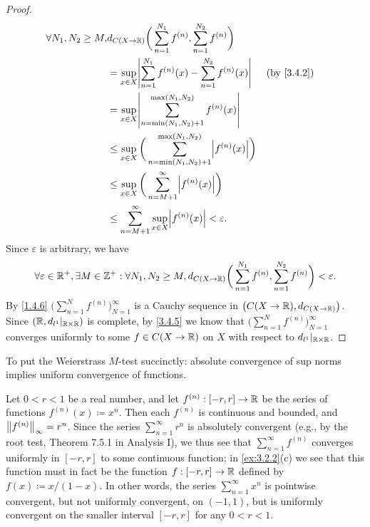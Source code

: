 \begin{proof}
  \begin{align*}
    \forall N_1, N_2 \geq M, & d_{C(X \to \R)}\bigg(\sum_{n = 1}^{N_1} f^{(n)}, \sum_{n = 1}^{N_2} f^{(n)}\bigg)                               \\
                             & = \sup_{x \in X} \abs{\sum_{n = 1}^{N_1} f^{(n)}(x) - \sum_{n = 1}^{N_2} f^{(n)}(x)}            &  & \by{3.4.2} \\
                             & = \sup_{x \in X} \abs{\sum_{n = \min(N_1, N_2) + 1}^{\max(N_1, N_2)} f^{(n)}(x)}                                \\
                             & \leq \sup_{x \in X} \bigg(\sum_{n = \min(N_1, N_2) + 1}^{\max(N_1, N_2)} \abs{f^{(n)}(x)}\bigg)                 \\
                             & \leq \sup_{x \in X} \bigg(\sum_{n = M + 1}^\infty \abs{f^{(n)}(x)}\bigg)                                        \\
                             & \leq \sum_{n = M + 1}^\infty \sup_{x \in X} \abs{f^{(n)}(x)} < \varepsilon.
  \end{align*}
  Since \(\varepsilon\) is arbitrary, we have
  \[
    \forall \varepsilon \in \R^+, \exists M \in \Z^+ : \forall N_1, N_2 \geq M, d_{C(X \to \R)}\bigg(\sum_{n = 1}^{N_1} f^{(n)}, \sum_{n = 1}^{N_2} f^{(n)}\bigg) < \varepsilon.
  \]
  By \cref{1.4.6} \(\bigg(\sum_{n = 1}^N f^{(n)}\bigg)_{N = 1}^\infty\) is a Cauchy sequence in \(\big(C(X \to \R), d_{C(X \to \R)}\big)\).
  Since \((\R, d_{l^1}|_{\R \times \R})\) is complete, by \cref{3.4.5} we know that \(\bigg(\sum_{n = 1}^N f^{(n)}\bigg)_{N = 1}^\infty\) converges uniformly to some \(f \in C(X \to \R)\) on \(X\) with respect to \(d_{l^1}|_{\R \times \R}\).
\end{proof}

\begin{note}
  To put the Weierstrass \(M\)-test succinctly:
  absolute convergence of sup norms implies uniform convergence of functions.
\end{note}

\begin{eg}\label{3.5.8}
  Let \(0 < r < 1\) be a real number, and let \(f^{(n)} : [-r, r] \to \R\) be the series of functions \(f^{(n)}(x) \coloneqq x^n\).
  Then each \(f^{(n)}\) is continuous and bounded, and \(\norm*{f^{(n)}}_\infty = r^n\).
  Since the series \(\sum_{n = 1}^\infty r^n\) is absolutely convergent (e.g., by the root test, Theorem 7.5.1 in Analysis I), we thus see that \(\sum_{n = 1}^\infty f^{(n)}\) converges uniformly in \([-r, r]\) to some continuous function;
  in \cref{ex:3.2.2}(c) we see that this function must in fact be the function \(f : [-r, r] \to \R\) defined by \(f(x) \coloneqq x / (1 - x)\).
  In other words, the series \(\sum_{n = 1}^\infty x^n\) is pointwise convergent, but not uniformly convergent, on \((-1, 1)\), but is uniformly convergent on the smaller interval \([-r, r]\) for any \(0 < r < 1\).
\end{eg}

